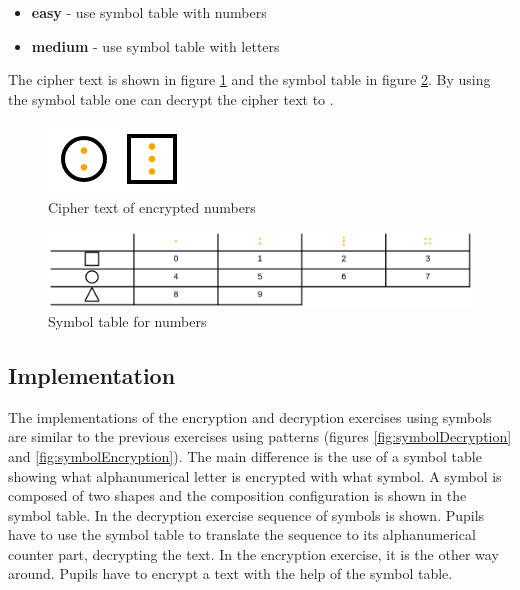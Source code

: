 \begin{itemize}
    \item \textbf{easy} - use symbol table with numbers
    \item \textbf{medium} - use symbol table with letters
\end{itemize}

\begin{example}
    The cipher text is shown in figure \ref{fig:cipher_number} and the symbol table in figure \ref{fig:symboltable_numbers}. By using the symbol table one can decrypt the cipher text to .
\end{example}

\begin{figure}[h]
    \centering
    \includegraphics[width=0.15\columnwidth]{figures/cipher_number.png}
    \caption{Cipher text of encrypted numbers}
    \label{fig:cipher_number} 
\end{figure}
\begin{figure}[h]
    \centering
    \includegraphics[width=1.0\columnwidth]{figures/symboltable_numbers.png}
    \caption{Symbol table for numbers}
    \label{fig:symboltable_numbers} 
\end{figure}

\subsection{Implementation}

The implementations of the encryption and decryption exercises using symbols are similar to the previous exercises using patterns (figures \ref{fig:symbolDecryption} and \ref{fig:symbolEncryption}). The main difference is the use of a symbol table showing what alphanumerical letter is encrypted with what symbol. A symbol is composed of two shapes and the composition configuration is shown in the symbol table. In the decryption exercise sequence of symbols is shown. Pupils have to use the symbol table to translate the sequence to its alphanumerical counter part, decrypting the text. In the encryption exercise, it is the other way around. Pupils have to encrypt a text with the help of the symbol table.

